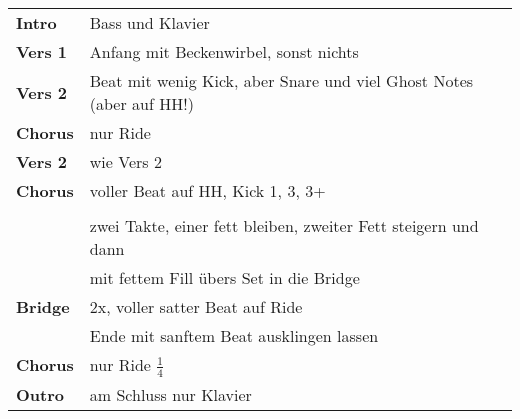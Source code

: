 
\begin{tabular}{p{1.6cm}l}
	\textbf{Intro}  & Bass und Klavier                                                    \\
	\textbf{Vers 1} & Anfang mit Beckenwirbel, sonst nichts                               \\
	\textbf{Vers 2} & Beat mit wenig Kick, aber Snare und viel Ghost Notes (aber auf HH!) \\
	\textbf{Chorus} & nur Ride                                                            \\
	\textbf{Vers 2} & wie Vers 2                                                          \\
	\textbf{Chorus} & voller Beat auf HH, Kick 1, 3, 3+                                   \\
	                &                                                                     \\
	                & zwei Takte, einer fett bleiben, zweiter Fett steigern und dann      \\
	                & mit fettem Fill übers Set in die Bridge                             \\
	\textbf{Bridge} & 2x, voller satter Beat auf Ride                                     \\
	                & Ende mit sanftem Beat ausklingen lassen                             \\
	\textbf{Chorus} & nur Ride $\frac{1}{4}$                                              \\
	\textbf{Outro}  & am Schluss nur Klavier                                              \\
\end{tabular}

